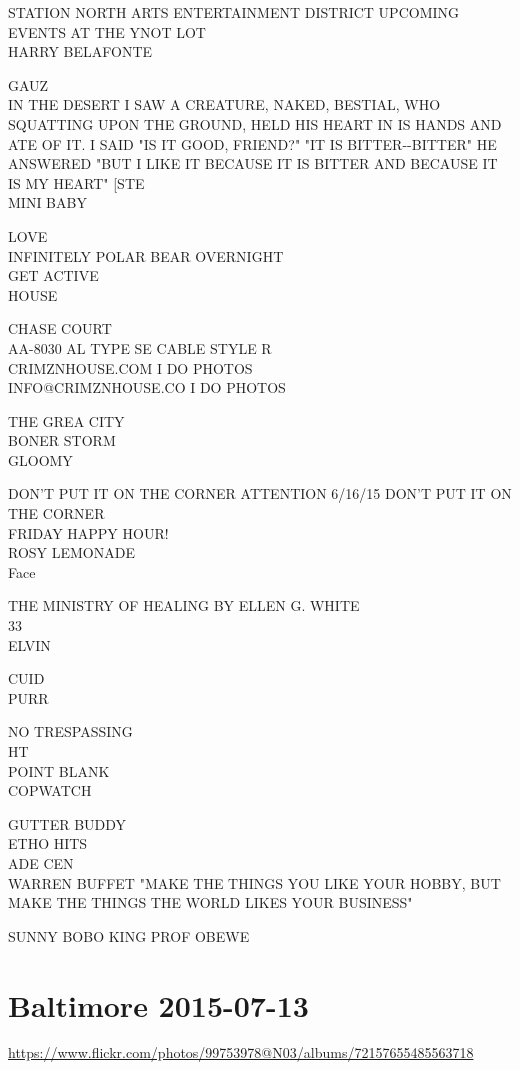 \documentclass[10pt,letterpaper]{article}
\begin{document}
STATION NORTH ARTS ENTERTAINMENT DISTRICT UPCOMING EVENTS AT THE YNOT LOT\\
HARRY BELAFONTE

GAUZ\\
IN THE DESERT I SAW A CREATURE, NAKED, BESTIAL, WHO SQUATTING UPON THE GROUND, HELD HIS HEART IN IS HANDS AND ATE OF IT.  I SAID "IS IT GOOD, FRIEND?"  "IT IS BITTER{-}{-}BITTER" HE ANSWERED "BUT I LIKE IT BECAUSE IT IS BITTER AND BECAUSE IT IS MY HEART" {[}STE\\
MINI BABY

LOVE\\
INFINITELY POLAR BEAR OVERNIGHT\\
GET ACTIVE\\
HOUSE

CHASE COURT\\
AA{-}8030 AL TYPE SE CABLE STYLE R\\
CRIMZNHOUSE.COM I DO PHOTOS\\
INFO@CRIMZNHOUSE.CO I DO PHOTOS

THE GREA CITY\\
BONER STORM\\
GLOOMY

DON'T PUT IT ON THE CORNER ATTENTION 6/16/15 DON'T PUT IT ON THE CORNER\\
FRIDAY HAPPY HOUR!\\
ROSY LEMONADE\\
Face

THE MINISTRY OF HEALING BY ELLEN G. WHITE\\
33\\
ELVIN

CUID\\
PURR

NO TRESPASSING\\
HT\\
POINT BLANK\\
COPWATCH

GUTTER BUDDY\\
ETHO HITS\\
ADE CEN\\
WARREN BUFFET "MAKE THE THINGS YOU LIKE YOUR HOBBY, BUT MAKE THE THINGS THE WORLD LIKES YOUR BUSINESS"

SUNNY BOBO KING PROF OBEWE
\

\section*{Baltimore 2015-07-13}

\url{https://www.flickr.com/photos/99753978@N03/albums/72157655485563718}
\end{document}
